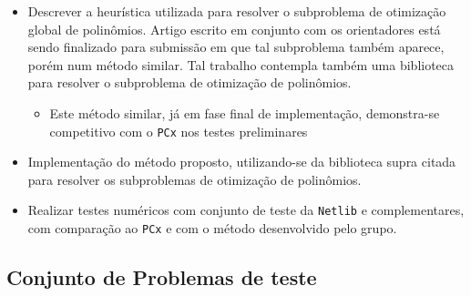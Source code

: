 \begin{itemize}
\item Descrever a heurística utilizada para resolver o subproblema de otimização
global de polinômios. Artigo escrito em conjunto com os orientadores está sendo
finalizado para submissão em que tal subproblema também aparece, porém num
método similar. Tal trabalho contempla também uma biblioteca para resolver o
subproblema de otimização de polinômios.
\begin{itemize}
  \item Este método similar, já em fase final de implementação,
  demonstra-se competitivo com o \texttt{PCx} nos testes preliminares
 \end{itemize}
\item Implementação do método proposto, utilizando-se da biblioteca supra
citada para resolver os subproblemas de otimização de polinômios.
\item Realizar  testes
numéricos com conjunto de teste da \texttt{Netlib} e complementares, com
comparação ao \texttt{PCx} e com o método desenvolvido pelo grupo.
\end{itemize}



\subsection{Conjunto de Problemas de teste}


